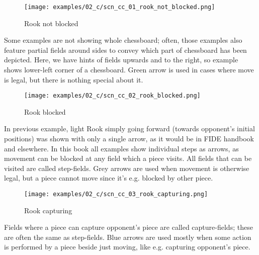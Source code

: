 \vspace*{-0.7\baselineskip}
\noindent
\begin{wrapfigure}[12]{l}{0.4\textwidth}
\centering
\texttt{[image: examples/02\_c/scn\_cc\_01\_rook\_not\_blocked.png]}
\vspace*{-1.4\baselineskip}
\caption{Rook not blocked}
\label{fig:scn_cc_01_rook_not_blocked}
\end{wrapfigure}
Some examples are not showing whole chessboard; often, those examples also
feature partial fields around sides to convey which part of chessboard has
been depicted. \newline
\indent
Here, we have hints of fields upwards and to the right, so example shows
lower-left corner of a chessboard. \newline
\indent
Green arrow is used in cases where move is legal, but there is nothing special
about it.

\vspace*{2.7\baselineskip}
\noindent
\begin{wrapfigure}[14]{l}{0.4\textwidth}
\centering
\texttt{[image: examples/02\_c/scn\_cc\_02\_rook\_blocked.png]}
\vspace*{-1.4\baselineskip}
\caption{Rook blocked}
\label{fig:scn_cc_02_rook_blocked}
\end{wrapfigure}
In previous example, light Rook simply going forward (towards opponent's initial
positions) was shown with only a single arrow, as it would be in FIDE handbook and
elsewhere. \newline
\indent
In this book all examples show individual steps as arrows, as movement can be
blocked at any field which a piece visits. All fields that can be visited are
called step-fields. \newline
\indent
Grey arrows are used when movement is otherwise legal, but a piece cannot move
since it's e.g. blocked by other piece.

\clearpage %

\vspace*{-1.4\baselineskip}
\noindent
\begin{wrapfigure}[8]{l}{0.4\textwidth}
\centering
\texttt{[image: examples/02\_c/scn\_cc\_03\_rook\_capturing.png]}
\vspace*{-1.4\baselineskip}
\caption{Rook capturing}
\label{fig:scn_cc_03_rook_capturing}
\end{wrapfigure}
Fields where a piece can capture opponent's piece are called capture-fields;
these are often the same as step-fields. \newline
\indent
Blue arrows are used mostly when some action is performed by a piece beside just
moving, like e.g. capturing opponent's piece.

